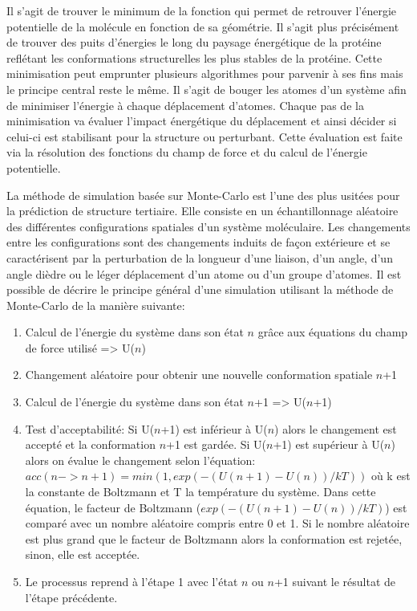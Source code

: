 
Il s'agit de trouver le minimum de la fonction qui permet de retrouver l'énergie potentielle de la molécule en fonction de sa géométrie. Il s'agit plus précisément de trouver des puits d'énergies le long du paysage énergétique de la protéine reflétant les conformations structurelles les plus stables de la protéine. Cette minimisation peut emprunter plusieurs algorithmes pour parvenir à ses fins mais le principe central reste le même. Il s'agit de bouger les atomes d'un système afin de minimiser l'énergie à chaque déplacement d'atomes. Chaque pas de la minimisation va évaluer l'impact énergétique du déplacement et ainsi décider si celui-ci est stabilisant pour la structure ou perturbant. Cette évaluation est faite via la résolution des fonctions du champ de force et du calcul de l'énergie potentielle.



La méthode de simulation basée sur Monte-Carlo est l'une des plus usitées \cite{metropolis1949monte} pour la prédiction de structure tertiaire. Elle consiste en un échantillonnage aléatoire des différentes configurations spatiales d'un système moléculaire. Les changements entre les configurations sont des changements induits de façon extérieure et se caractérisent par la perturbation de la longueur d'une liaison, d'un angle, d'un angle dièdre ou le léger déplacement d'un atome ou d'un groupe d'atomes. 
Il est possible de décrire le principe général d'une simulation utilisant la méthode de Monte-Carlo de la manière suivante:

\begin{enumerate}
  \item Calcul de l'énergie du système dans son état $n$ grâce aux équations du champ de force utilisé => U($n$)
  \item Changement aléatoire pour obtenir une nouvelle conformation spatiale $n$+1
  \item Calcul de l'énergie du système dans son état $n$+1 => U($n$+1)
  \item Test d'acceptabilité: 
  Si U($n$+1) est inférieur à U($n$) alors le changement est accepté et la conformation $n$+1 est gardée. 
  Si U($n$+1) est supérieur à U($n$) alors on évalue le changement selon l'équation: $acc(n -> n+1) = min(1, exp(-(U(n+1)-U(n))/kT))$ où k est la constante de Boltzmann et T la température du système. Dans cette équation, le facteur de Boltzmann ($exp(-(U(n+1)-U(n))/kT)$) est comparé avec un nombre aléatoire compris entre 0 et 1. Si le nombre aléatoire est plus grand que le facteur de Boltzmann alors la conformation est rejetée, sinon, elle est acceptée.
  \item Le processus reprend à l'étape 1 avec l'état $n$ ou $n$+1 suivant le résultat de l'étape précédente.
\end{enumerate}

